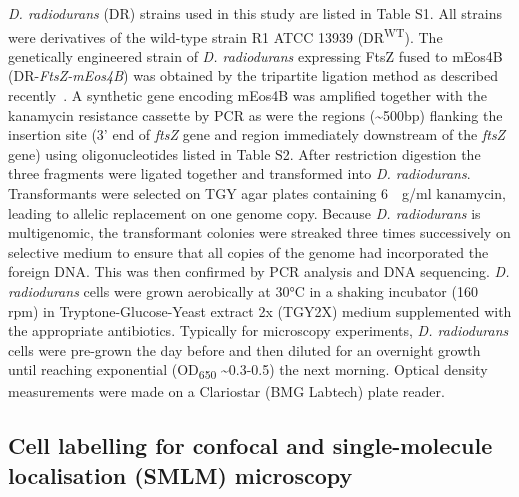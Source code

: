 \textit{D. radiodurans} (DR) strains used in this study are listed in Table S1.
All strains were derivatives of the wild-type strain R1 ATCC 13939 (DR\textsuperscript{WT}).
The genetically engineered strain of \textit{D. radiodurans} expressing FtsZ fused to mEos4B (DR-\textit{FtsZ-mEos4B}) was obtained by the tripartite ligation method as described recently~\cite{vauclareStressinducedNucleoidRemodeling2024}.
A synthetic gene encoding mEos4B was amplified together with the kanamycin resistance cassette by PCR as were the regions (\sim500bp) flanking the insertion site (3' end of \textit{ftsZ} gene and region immediately downstream of the \textit{ftsZ} gene) using oligonucleotides listed in Table S2.
After restriction digestion the three fragments were ligated together and transformed into \textit{D. radiodurans}.
Transformants were selected on TGY agar plates containing \qty{6}{\mu{}g/ml} kanamycin, leading to allelic replacement on one genome copy.
Because \textit{D. radiodurans} is multigenomic, the transformant colonies were streaked three times successively on selective medium to ensure that all copies of the genome had incorporated the foreign DNA.
This was then confirmed by PCR analysis and DNA sequencing.
\textit{D. radiodurans} cells were grown aerobically at 30°C in a shaking incubator (160 rpm) in Tryptone-Glucose-Yeast extract 2x (TGY2X) medium supplemented with the appropriate antibiotics.
Typically for microscopy experiments, \textit{D. radiodurans} cells were pre-grown the day before and then diluted for an overnight growth until reaching exponential (OD\textsubscript{650} \sim0.3-0.5) the next morning.
Optical density measurements were made on a Clariostar (BMG Labtech) plate reader.

\subsection{Cell labelling for confocal and single-molecule localisation (SMLM) microscopy}

